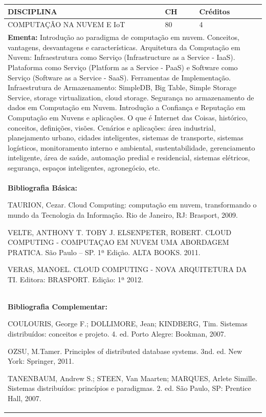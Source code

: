 \documentclass[a4paper, 12pt, openright, oneside, german, french, english, brazil]{abntex2}
\begin{document}
\begin{table}[!h]
  \footnotesize
  \centering
  \begin{tabular}{|p{100mm}|p{10mm}|p{20mm}|}
    \hline
    \textbf{DISCIPLINA} & \textbf{CH} & \textbf{Créditos} \\
    \hline
    COMPUTAÇÃO NA NUVEM E IoT  & 80 & 4 \\
    \hline
    \multicolumn{3}{|p{130mm}|}{\textbf{Ementa:}  Introdução ao paradigma de computação em nuvem. Conceitos, vantagens, desvantagens e características. Arquitetura da Computação em Nuvem: Infraestrutura como Serviço (Infrastructure as a Service - IaaS). Plataforma como Serviço (Platform as a Service - PaaS) e Software como Serviço (Software as a Service - SaaS). Ferramentas de Implementação. Infraestrutura de Armazenamento: SimpleDB, Big Table, Simple Storage Service, storage virtualization, cloud storage. Segurança no armazenamento de dados em Computação em Nuvem. Introdução a Confiança e Reputação em Computação em Nuvens e aplicações. O que é Internet das Coisas, histórico, conceitos, definições, visões. Cenários e aplicações: área industrial, planejamento urbano, cidades inteligentes, sistemas de transporte, sistemas logísticos, monitoramento interno e ambiental, sustentabilidade, gerenciamento inteligente, área de saúde, automação predial e residencial, sistemas elétricos, segurança, espaços inteligentes, agronegócio, etc.} \\
    \hline
    \multicolumn{3}{|p{130mm}|}{\textbf{Bibliografia Básica:}

    TAURION, Cezar. Cloud Computing: computação em nuvem, transformando o mundo da Tecnologia da Informação. Rio de Janeiro, RJ: Brasport, 2009. 

VELTE, ANTHONY T. TOBY J. ELSENPETER, ROBERT. CLOUD COMPUTING - COMPUTAÇAO EM NUVEM UMA ABORDAGEM PRATICA. São Paulo – SP. 1ª Edição. ALTA BOOKS. 2011. 

VERAS, MANOEL. CLOUD COMPUTING - NOVA ARQUITETURA DA TI. Editora: BRASPORT. Edição: 1ª 2012.
} \\
    \hline
    \multicolumn{3}{|p{130mm}|}{\textbf{Bibliografia Complementar:}

    COULOURIS, George F.; DOLLIMORE, Jean; KINDBERG, Tim. Sistemas distribuídos: conceitos e projeto. 4. ed. Porto Alegre: Bookman, 2007.

OZSU, M.Tamer. Principles of distributed database systems. 3nd. ed. New York: Springer, 2011.

TANENBAUM, Andrew S.; STEEN, Van Maarten; MARQUES, Arlete Simille. Sistemas
distribuídos: princípios e paradigmas. 2. ed. São Paulo, SP: Prentice Hall, 2007. 
} \\
    \hline
  \end{tabular}
\end{table}
\end{document}
